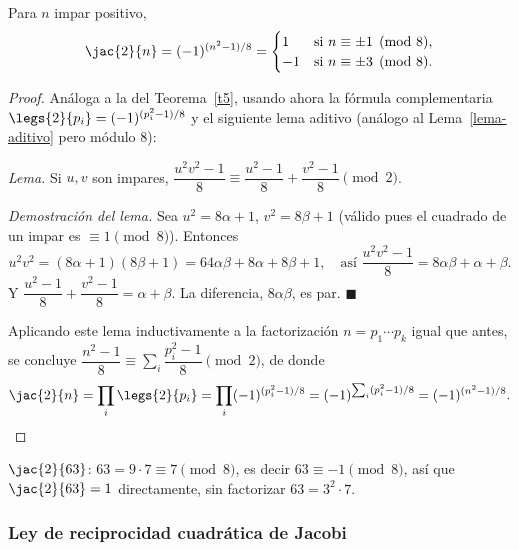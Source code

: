 \begin{teorema}\label{t6}
Para $n$ impar positivo,
\[
\jac{2}{n}=(-1)^{(n^2-1)/8}=
\begin{cases}
1 & \text{si } n\equiv\pm1\pmod8,\\
-1 & \text{si } n\equiv\pm3\pmod8.
\end{cases}
\]
\end{teorema}
\begin{proof}
Análoga a la del Teorema~\ref{t5}, usando ahora la fórmula complementaria $\legs{2}{p_i}=(-1)^{(p_i^2-1)/8}$ y el siguiente lema aditivo (análogo al Lema~\ref{lema-aditivo} pero módulo $8$):

\emph{Lema.} Si $u,v$ son impares, $\dfrac{u^2v^2-1}{8}\equiv\dfrac{u^2-1}{8}+\dfrac{v^2-1}{8}\pmod2$.

\emph{Demostración del lema.} Sea $u^2=8\alpha+1$, $v^2=8\beta+1$ (válido pues el cuadrado de un impar es $\equiv1\pmod8$). Entonces
\[
u^2v^2=(8\alpha+1)(8\beta+1)=64\alpha\beta+8\alpha+8\beta+1,\quad\text{así } \frac{u^2v^2-1}{8}=8\alpha\beta+\alpha+\beta.
\]
Y $\dfrac{u^2-1}{8}+\dfrac{v^2-1}{8}=\alpha+\beta$. La diferencia, $8\alpha\beta$, es par. $\blacksquare$

Aplicando este lema inductivamente a la factorización $n=p_1\cdots p_k$ igual que antes, se concluye $\dfrac{n^2-1}{8}\equiv\sum_i\dfrac{p_i^2-1}{8}\pmod2$, de donde
\[
\jac{2}{n}=\prod_i\legs{2}{p_i}=\prod_i(-1)^{(p_i^2-1)/8}=(-1)^{\sum_i(p_i^2-1)/8}=(-1)^{(n^2-1)/8}. \qedhere
\]
\end{proof}

\begin{ejemplo}
$\jac{2}{63}$: $63=9\cdot7\equiv7\pmod8$, es decir $63\equiv-1\pmod8$, así que $\jac{2}{63}=1$ directamente, sin factorizar $63=3^2\cdot7$.
\end{ejemplo}

\subsubsection{Ley de reciprocidad cuadrática de Jacobi}

